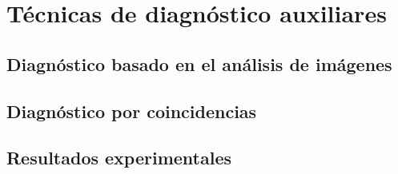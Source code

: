 \chapter{Técnicas de diagnóstico auxiliares}
\label{ch:TecnicasAuxiliares}

\lettrine[lraise=-0.1, lines=2, loversize=0.2]{}{}


\section{Diagnóstico basado en el análisis de imágenes}
\label{sec:HuDist}


\section{Diagnóstico por coincidencias}
\label{sec:CoincDist}


\section{Resultados experimentales}
\label{sec:CycleResults}


\endinput
